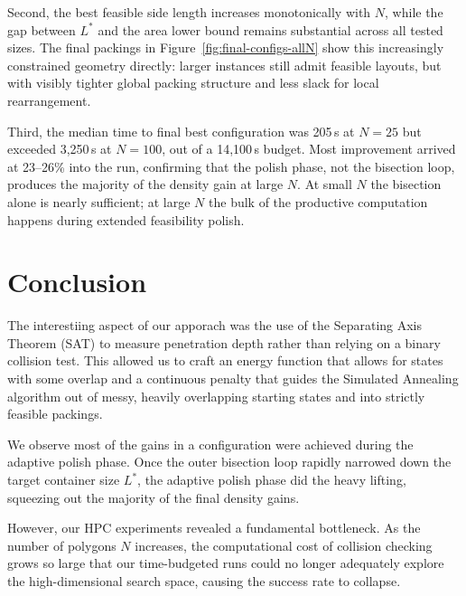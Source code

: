 \documentclass[10pt]{article}
\begin{document}
Second, the best feasible side length increases monotonically with
$N$, while the gap between $L^*$ and the area lower bound remains substantial across all tested
sizes. The final packings in Figure~\ref{fig:final-configs-allN}
show this increasingly constrained geometry directly: larger instances
still admit feasible layouts, but with visibly tighter global packing
structure and less slack for local rearrangement.

Third, the median time to final best configuration was 205\,s at
$N = 25$ but exceeded 3{,}250\,s at $N = 100$, out of a 14{,}100\,s
budget. Most improvement arrived at 23--26\% into the run, confirming
that the polish phase, not the bisection loop, produces the majority
of the density gain at large $N$. At small $N$ the bisection alone is
nearly sufficient; at large $N$ the bulk of the productive computation
happens during extended feasibility polish.


\clearpage

\section{Conclusion}
\label{sec:conclusion}

The interestiing aspect of our apporach was the use of 
the Separating Axis Theorem (SAT) to measure penetration depth rather
than relying on a binary collision test. This allowed us to craft an energy
function that allows for states with some overlap and a continuous penalty that guides the
Simulated Annealing algorithm out of messy, heavily overlapping
starting states and into strictly feasible packings. 

We observe most of the gains in a configuration were achieved during the adaptive polish phase. 
Once the outer
bisection loop rapidly narrowed down the target container size $L^*$,
the adaptive polish phase did the heavy lifting, squeezing out the
majority of the final density gains.

However, our HPC experiments revealed a fundamental bottleneck. As the
number of polygons $N$ increases, the computational cost of collision
checking grows so large that our time-budgeted runs could no longer
adequately explore the high-dimensional search space, causing the
success rate to collapse.
\end{document}
